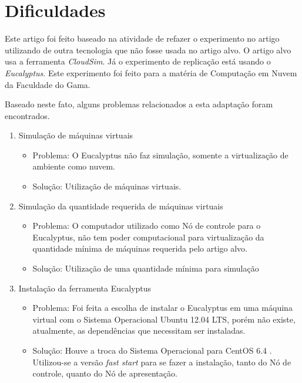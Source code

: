 \section{Dificuldades}
\label{sec:dificuldades}

Este artigo foi feito baseado na atividade de refazer o experimento no artigo \cite{elaine_et_al:14} utilizando de outra tecnologia que não fosse usada no artigo alvo. O artigo alvo usa a ferramenta \textit{CloudSim}. Já o experimento de replicação está usando o \textit{Eucalyptus}. Este experimento foi feito para a matéria de Computação em Nuvem da Faculdade do Gama.

Baseado neste fato, alguns problemas relacionados a esta adaptação foram encontrados.

\begin{enumerate}

  \item Simulação de máquinas virtuais
  \begin{itemize}
    \item Problema: O Eucalyptus não faz simulação, somente a virtualização de ambiente como nuvem.
    \item Solução: Utilização de máquinas virtuais.
  \end{itemize}

  \item Simulação da quantidade requerida de máquinas virtuais
  \begin{itemize}
    \item Problema: O computador utilizado como Nó de controle para o Eucalyptus, não tem poder computacional para virtualização da quantidade mínima de máquinas requerida pelo artigo alvo.
    \item Solução: Utilização de uma quantidade mínima para simulação
  \end{itemize}

  \item Instalação da ferramenta Eucalyptus
  \begin{itemize}
    \item Problema: Foi feita a escolha de instalar o Eucalyptus em uma máquina virtual com o Sistema Operacional Ubuntu 12.04 LTS, porém não existe, atualmente, as dependências que necessitam ser instaladas.
    \item Solução: Houve a troca do Sistema Operacional para CentOS 6.4 . Utilizou-se a versão \textit{fast start} para se fazer a instalação, tanto do Nó de controle, quanto do Nó de apresentação.
  \end{itemize}

\end{enumerate}


\begin{comment}

  \item Instalação da ferramenta Eucalyptus
  \begin{itemize}
    \item Problema:
    \item Solução:
  \end{itemize}


\end{comment}
